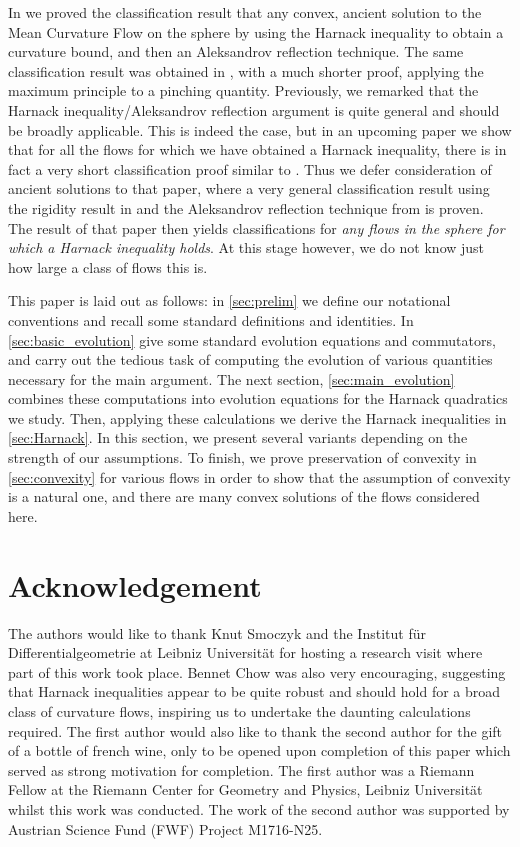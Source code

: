 \documentclass{amsart}
\begin{document}
In \cite{IvakiBryan:08/2015} we proved the classification result that any convex, ancient solution to the Mean Curvature Flow on the sphere by using the Harnack inequality to obtain a curvature bound, and then an Aleksandrov reflection technique. The same classification result was obtained in \cite{MR3399098}, with a much shorter proof, applying the maximum principle to a pinching quantity. Previously, we remarked that the Harnack inequality/Aleksandrov reflection argument is quite general and should be broadly applicable. This is indeed the case, but in an upcoming paper \cite{BryanIvakiScheuer:0} we show that for all the flows for which we have obtained a Harnack inequality, there is in fact a very short classification proof similar to \cite{MR3399098}. Thus we defer consideration of ancient solutions to that paper, where a very general classification result using the rigidity result in \cite{MakowskiScheuer:/2013} and the Aleksandrov reflection technique from \cite{bryanlouie,IvakiBryan:08/2015} is proven. The result of that paper then yields classifications for \emph{any flows in the sphere for which a Harnack inequality holds}. At this stage however, we do not know just how large a class of flows this is.

This paper is laid out as follows: in \cref{sec:prelim} we define our notational conventions and recall some standard definitions and identities. In \cref{sec:basic_evolution} give some standard evolution equations and commutators, and carry out the tedious task of computing the evolution of various quantities necessary for the main argument. The next section, \cref{sec:main_evolution} combines these computations into evolution equations for the Harnack quadratics we study. Then, applying these calculations we derive the Harnack inequalities in \cref{sec:Harnack}. In this section, we present several variants depending on the strength of our assumptions. To finish, we prove preservation of convexity in \cref{sec:convexity} for various flows in order to show that the assumption of convexity is a natural one, and there are many convex solutions of the flows considered here.

\section*{Acknowledgement}

The authors would like to thank Knut Smoczyk and the Institut für Differentialgeometrie at Leibniz Universität for hosting a research visit where part of this work took place. Bennet Chow was also very encouraging, suggesting that Harnack inequalities appear to be quite robust and should hold for a broad class of curvature flows, inspiring us to undertake the daunting calculations required. The first author would also like to thank the second author for the gift of a bottle of french wine, only to be opened upon completion of this paper which served as strong motivation for completion. The first author was a Riemann Fellow at the Riemann Center for Geometry and Physics, Leibniz Universität whilst this work was conducted. The work of the second author was supported by Austrian Science Fund (FWF) Project M1716-N25. 
\end{document}
